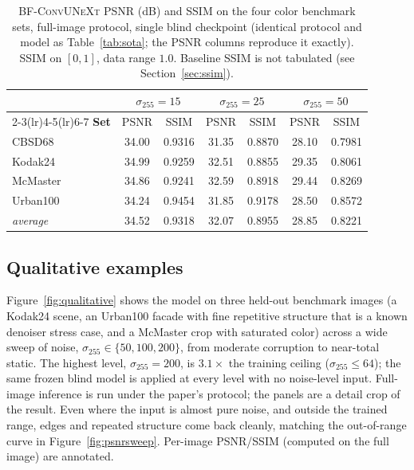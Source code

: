 \documentclass{article}
\newcommand{\model}{\textsc{BF-ConvUNeXt}}
\newcommand{\sigpx}{\sigma_{255}}
\begin{document}
\begin{table}[H]
\centering
\caption{\model{} PSNR (dB) and SSIM on the four color benchmark sets, full-image protocol, single blind checkpoint (identical protocol and model as Table~\ref{tab:sota}; the PSNR columns reproduce it exactly). SSIM on $[0,1]$, data range $1.0$. Baseline SSIM is not tabulated (see Section~\ref{sec:ssim}).}
\label{tab:ssim}
\renewcommand{\arraystretch}{1.15}
\begin{tabular}{lcccccc}
\toprule
 & \multicolumn{2}{c}{$\sigpx=15$} & \multicolumn{2}{c}{$\sigpx=25$} & \multicolumn{2}{c}{$\sigpx=50$} \\
\cmidrule(lr){2-3}\cmidrule(lr){4-5}\cmidrule(lr){6-7}
\textbf{Set} & PSNR & SSIM & PSNR & SSIM & PSNR & SSIM \\
\midrule
CBSD68   & 34.00 & 0.9316 & 31.35 & 0.8870 & 28.10 & 0.7981 \\
Kodak24  & 34.99 & 0.9259 & 32.51 & 0.8855 & 29.35 & 0.8061 \\
McMaster & 34.86 & 0.9241 & 32.59 & 0.8918 & 29.44 & 0.8269 \\
Urban100 & 34.24 & 0.9454 & 31.85 & 0.9178 & 28.50 & 0.8572 \\
\midrule
\emph{average} & 34.52 & 0.9318 & 32.07 & 0.8955 & 28.85 & 0.8221 \\
\bottomrule
\end{tabular}
\end{table}

\subsection{Qualitative examples}
\label{sec:qualitative}
Figure~\ref{fig:qualitative} shows the model on three held-out benchmark images (a Kodak24 scene, an Urban100 facade with fine repetitive structure that is a known denoiser stress case, and a McMaster crop with saturated color) across a wide sweep of noise, $\sigpx\in\{50,100,200\}$, from moderate corruption to near-total static. The highest level, $\sigpx{=}200$, is $3.1\times$ the training ceiling ($\sigpx{\le}64$); the same frozen blind model is applied at every level with no noise-level input. Full-image inference is run under the paper's protocol; the panels are a detail crop of the result. Even where the input is almost pure noise, and outside the trained range, edges and repeated structure come back cleanly, matching the out-of-range curve in Figure~\ref{fig:psnrsweep}. Per-image PSNR/SSIM (computed on the full image) are annotated.
\end{document}
